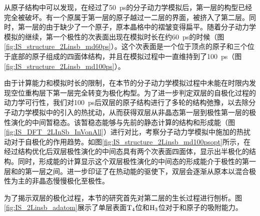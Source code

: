 从原子结构中可以发现，在经过了\SI{50}{\pico\second}的分子动力学模拟后，第一层的构型已经完全被破坏。有一个原属于第一层的原子越过一二层的界面，被挤入了第二层。同时，第一层的由于缺少了一个原子，原本晶格中的褶皱变得扁平。随着分子动力学模拟的继续，第一个极性的次表面出现在模拟时长在约\SI{60}{\pico\second}的时候（图\ref{fig:IS_structure_2Linsb_md60ps}）。这个次表面是一个位于顶点的原子和三个位于底部的原子组成的四面体结构，并且在模拟过程中一直维持到了\SI{100}{\pico\second}（图\ref{fig:IS_structure_2Linsb_md100ps}）。


由于计算能力和模拟时长的限制，在本节的分子动力学模拟过程中未能在时限内发现空位重构层下第一层完全转变为极化构型。为了进一步判定双层的自极化过程的动力学可行性，我们对\SI{100}{\pico\second}后双层的原子结构进行了多轮的结构弛豫，以去除分子动力学模拟中的引入的热扰动，从而获得双层从非晶态第一层到极性第一层的极性演化的中间暂稳态。该暂稳态能够与先前的静态计算的结构和形成能（图\ref{fig:IS_DFT_2LInSb_InVonAll}）进行对比，考察分子动力学模拟中施加的热扰动对于自极化的作用趋势。如图\ref{fig:IS_structure_2Linsb_md100psopt}所示，在经过结构优化后双层极性演化的中间态具有两个次表面四面体，显示出半极化的结构。同时，形成能的计算显示这个双层极性演化的中间态的形成能介于极性的第一层和的第一层之间。进一步印证了在热动能的驱使下，双层会逐渐从原本以混合极性为主的非晶态慢慢极化至极性。

为了揭示双层的极化过程，本节的研究首先对第二层的生长过程进行刨析。图\ref{fig:IS_2Linsb_adatom}展示了单层表面$\rm T_{4} \it$位和$\rm H_{3} \it$位对于和原子的吸附能力。

